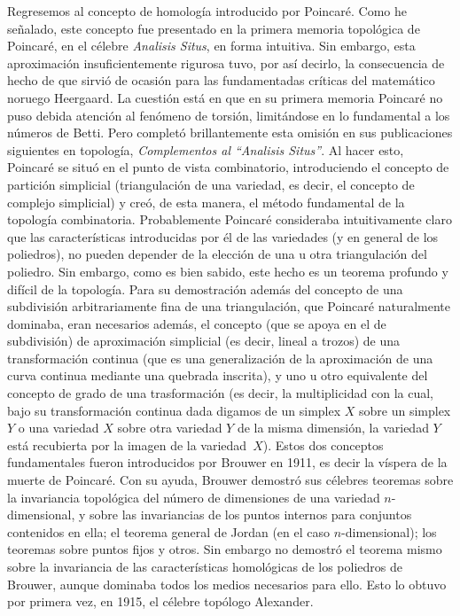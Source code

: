 \documentclass[a4paper, 12pt]{article}
\begin{document}
Regresemos al concepto de homología introducido por Poincaré. Como he señalado, este concepto fue presentado en la primera memoria topológica de Poincaré, en el célebre {\it Analisis Situs}, en forma intuitiva. Sin  embargo, esta aproximación insuficientemente rigurosa tuvo, por así decirlo, la consecuencia de hecho de que sirvió de ocasión para las fundamentadas críticas del matemático noruego Heergaard. La cuestión está en que en su primera memoria Poincaré no puso debida atención al fenómeno de torsión, limitándose en lo fundamental a los números de Betti. Pero completó brillantemente esta omisión en sus publicaciones siguientes en topología, {\it Complementos al ``Analisis Situs''}. Al hacer esto, Poincaré se situó en el punto de vista combinatorio, introduciendo el concepto de partición simplicial
(triangulación de una variedad, es decir, el concepto
de complejo simplicial) y creó, de esta manera, el método fundamental de la topología combinatoria. Probablemente Poincaré consideraba intuitivamente claro que las características introducidas por él de las variedades (y en general de los poliedros), no pueden depender de la elección de una u otra triangulación del poliedro. Sin embargo, como es bien sabido, este hecho es un teorema profundo y difícil de la topología. Para su demostración además del concepto de una subdivisión arbitrariamente fina de una triangulación, que Poincaré naturalmente dominaba, eran necesarios además, el concepto (que se apoya en el de subdivisión) de aproximación simplicial (es decir, lineal a trozos) de una transformación continua (que es una generalización de la aproximación de una curva continua mediante una quebrada inscrita), y uno u otro equivalente del concepto de grado de una trasformación (es decir, la multiplicidad con la cual, bajo su transformación continua dada digamos de un simplex $X$ sobre un simplex $Y$ o una variedad $X$ sobre otra variedad $Y$ de la misma dimensión, la variedad $Y$ está recubierta por la imagen de la variedad~$X$). Estos dos conceptos fundamentales fueron introducidos por Brouwer en 1911, es decir la víspera de la muerte de Poincaré. Con su ayuda, Brouwer demostró sus célebres teoremas sobre la invariancia topológica del número de dimensiones de una variedad $n$-dimensional, y sobre las invariancias de los puntos internos para conjuntos contenidos en ella; el teorema general de Jordan (en el caso $n$-dimensional); los teoremas sobre puntos fijos y otros. Sin embargo no demostró el teorema mismo sobre la invariancia de las características homológicas de los poliedros de Brouwer, aunque dominaba todos los medios necesarios para ello. Esto lo obtuvo por primera vez, en 1915, el célebre topólogo Alexander.
\end{document}
